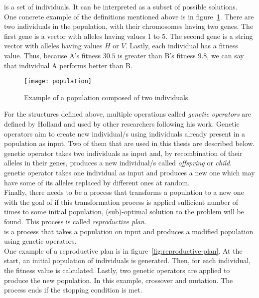  is a set of individuals.
It can be interpreted as a subset of possible solutions.\\

One concrete example of the definitions mentioned above is in figure~\ref{fig:population}.
There are two individuals in the population, with their chromosomes having two genes.
The first gene is a vector with alleles having values 1 to 5. The second gene is a string vector
with alleles having values $H$ or $V$. Lastly, each individual has a fitness value.
Thus, because A’s fitness $30.5$ is greater than B’s fitness $9.8$, we can say
that individual A performs better than B.


\begin{figure}
    \texttt{[image: population]}
    \caption[Population example]{Example of a population composed of two individuals.}
    \label{fig:population}
\end{figure}

For the structures defined above, multiple operations called \textit{genetic operators}
are defined by Holland and used by other researchers following his work.
Genetic operators aim to create new individual/s using individuals already present in a population as input.
Two of them that are used in this thesis are described below.\\


 genetic operator takes two individuals as input and, by recombination
of their alleles in their genes, produces a new individual/s called \textit{offspring} or \textit{child}.\\

 genetic operator takes one individual as input and produces a new one
which may have some of its alleles replaced by different ones at random.\\

Finally, there needs to be a process that transforms a population
to a new one with the goal of if this transformation process is applied sufficient
number of times to some initial population,
(sub)-optimal solution to the problem will be found.
This process is called \textit{reproductive plan}.\\

 is a process that takes a population on input and produces a modified
population using genetic operators.\\

One example of a reproductive plan is in figure~\ref{fig:reproductive-plan}.
At the start, an initial population of individuals is generated.
Then, for each individual, the fitness value is calculated.
Lastly, two genetic operators are applied to produce the new population.
In this example, crossover and mutation.
The process ends if the stopping condition is met.

